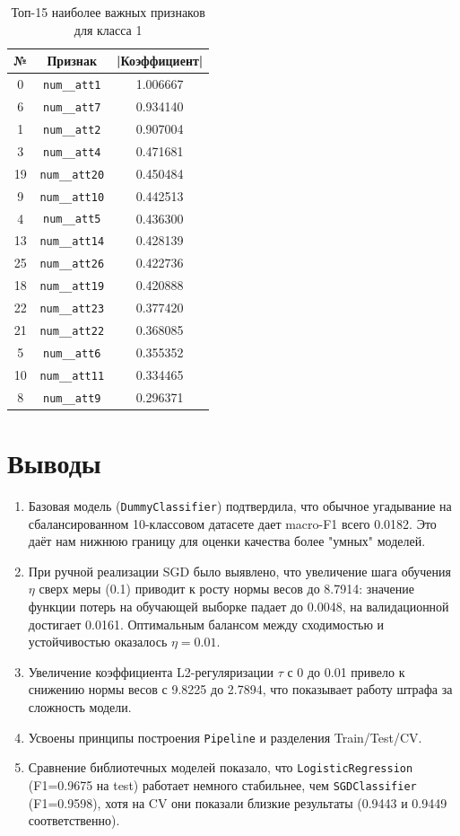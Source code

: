 \documentclass[oneside,a4paper,14pt]{extarticle}
\begin{document}
\begin{table}[ht]
\centering
\begin{tabular}{ccc}
\toprule
№ & Признак & |Коэффициент| \\
\midrule
0 & \texttt{num\_\_att1} & 1.006667 \\
6 & \texttt{num\_\_att7} & 0.934140 \\
1 & \texttt{num\_\_att2} & 0.907004 \\
3 & \texttt{num\_\_att4} & 0.471681 \\
19 & \texttt{num\_\_att20} & 0.450484 \\
9 & \texttt{num\_\_att10} & 0.442513 \\
4 & \texttt{num\_\_att5} & 0.436300 \\
13 & \texttt{num\_\_att14} & 0.428139 \\
25 & \texttt{num\_\_att26} & 0.422736 \\
18 & \texttt{num\_\_att19} & 0.420888 \\
22 & \texttt{num\_\_att23} & 0.377420 \\
21 & \texttt{num\_\_att22} & 0.368085 \\
5 & \texttt{num\_\_att6} & 0.355352 \\
10 & \texttt{num\_\_att11} & 0.334465 \\
8 & \texttt{num\_\_att9} & 0.296371 \\
\bottomrule
\end{tabular}
\caption{Топ-15 наиболее важных признаков для класса 1}

\end{table}

\newpage
\section*{Выводы}
\begin{enumerate}
    \item Базовая модель (\texttt{DummyClassifier}) подтвердила, что обычное угадывание на сбалансированном 10-классовом датасете дает macro-F1 всего 0.0182. Это даёт нам нижнюю границу для оценки качества более "умных" моделей.
    \item При ручной реализации SGD было выявлено, что увеличение шага обучения $\eta$ сверх меры (0.1) приводит к росту нормы весов до 8.7914: значение функции потерь на обучающей выборке падает до 0.0048, на валидационной достигает 0.0161. Оптимальным балансом между сходимостью и устойчивостью оказалось $\eta=0.01$.
    \item Увеличение коэффициента L2-регуляризации $\tau$ с 0 до 0.01 привело к снижению нормы весов с 9.8225 до 2.7894, что показывает работу штрафа за сложность модели.
    \item Усвоены принципы построения \texttt{Pipeline} и  разделения Train/Test/CV.
    \item Сравнение библиотечных моделей показало, что \texttt{LogisticRegression} (F1=0.9675 на test) работает немного стабильнее, чем \texttt{SGDClassifier} (F1=0.9598), хотя на CV они показали близкие результаты (0.9443 и 0.9449 соответственно).


\end{enumerate}

\newpage
\end{document}
